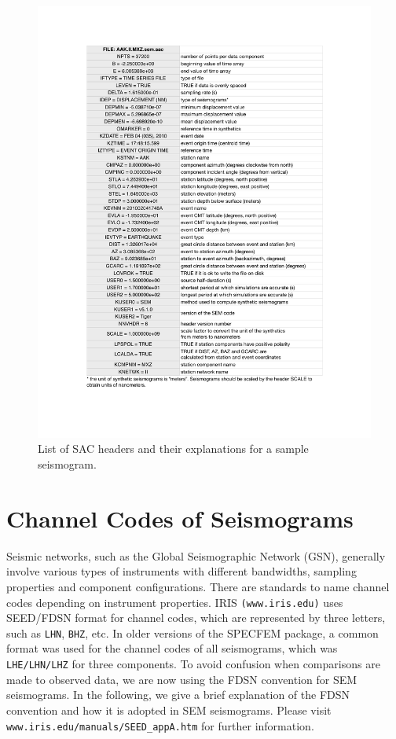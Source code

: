 \documentclass[oneside,english]{book}
\begin{document}
\begin{figure}[ht]
\noindent \begin{centering}
\includegraphics[scale=0.8]{figures/headers_sem_explained.pdf}\caption{\label{fig:SAC-headers}List of SAC headers and their explanations for a sample seismogram.}

\par\end{centering}
\end{figure}

\chapter{\label{cha:channel-codes}Channel Codes of Seismograms}

Seismic networks, such as the Global Seismographic Network (GSN), generally involve various types of instruments with different
bandwidths, sampling properties and component configurations.
There are standards to name channel codes depending on instrument properties. IRIS  \texttt{(www.iris.edu)} uses SEED/FDSN format
for channel codes, which are represented by three letters, such as \texttt{LHN}, \texttt{BHZ}, etc. In older versions of the
SPECFEM package, a common format was used for the channel codes of all seismograms, which was \texttt{LHE/LHN/LHZ}
for three components. To avoid confusion when comparisons are made to observed data, we are now using the FDSN convention
for SEM seismograms. In the following, we give a brief explanation of the FDSN convention and how it is adopted in SEM seismograms.
Please visit \texttt{www.iris.edu/manuals/SEED\_appA.htm} for further information.\\
\end{document}
